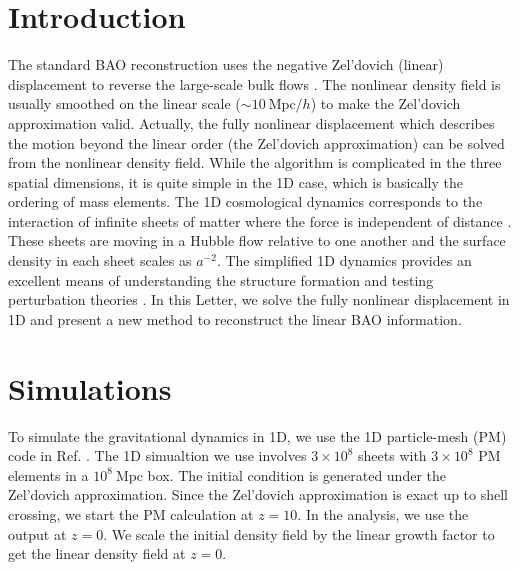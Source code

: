 \documentclass[aps,prd,twocolumn,showpacs,superscriptaddress,groupedaddress,nofootinbib]{revtex4}  %
\newcommand{\mr}{\mathrm}
\begin{document}
\section{Introduction}
The standard BAO reconstruction uses the negative
Zel'dovich (linear) displacement to reverse the large-scale bulk flows 
\cite{2007bao}. 
The nonlinear density field is usually smoothed on the linear scale 
($\sim10\ \mr{Mpc}/h$) to make the Zel'dovich approximation valid.
Actually, the fully nonlinear displacement which describes the motion beyond
the linear order (the Zel'dovich approximation) can be solved from the nonlinear
density field.
While the algorithm is complicated in the three spatial dimensions, it is 
quite simple in the 1D case, which is basically the ordering of mass elements.
The 1D cosmological dynamics corresponds to the interaction of infinite sheets
of matter where the force is independent of distance \cite{2016matt}.
These sheets are moving in a Hubble flow relative to one another and the surface
density in each sheet scales as $a^{-2}$.
The simplified 1D dynamics provides an excellent means of understanding the 
structure formation and testing perturbation theories \cite{2016matt}.
In this Letter, we solve the fully nonlinear displacement in 1D and present
a new method to reconstruct the linear BAO information.


\section{Simulations}
To simulate the gravitational dynamics in 1D, we use the 
1D particle-mesh (PM) code in Ref. \cite{2016matt}.
The 1D simualtion we use involves $3\times10^8$ sheets with $3\times10^8$ PM
elements in a $10^8\ \mr{Mpc}$ box.
The initial condition is generated under the Zel'dovich approximation.
Since the Zel'dovich approximation is exact up to shell crossing, we start 
the PM calculation at $z=10$. In the analysis, we use the output at $z=0$.
We scale the initial density field by the linear growth factor to get the
linear density field at $z=0$.
\end{document}
